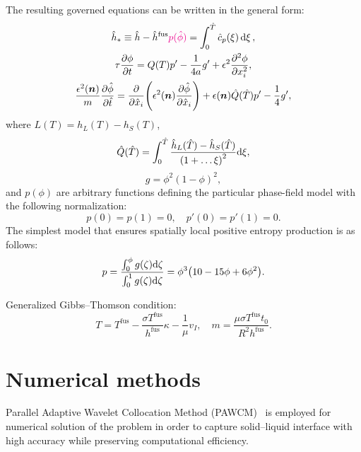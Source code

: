 \documentclass{article}
\newcommand{\fusion}[1]{{#1}^\mathrm{fus}}
\newcommand{\bn}{\boldsymbol{n}}
\newcommand{\Hx}{\hat{x}}
\newcommand{\Ht}{\hat{t}}
\newcommand{\Hh}{\hat{h}}
\newcommand{\HT}{\hat{T}}
\newcommand{\Hc}{\hat{c}}
\newcommand{\Hphi}{\hat{\phi}}
\newcommand\OVV[1]{{\color{magenta}#1}}
\begin{document}
The resulting governed equations can be written in the general form:
\begin{gather}
    \Hh_* \equiv \Hh - \fusion{\Hh}\OVV{p(\Hphi)} = \int_0^{\HT} \Hc_p(\xi)\dd{\xi}, \label{eq:enthalpy_new_hats} \\
    \tau\pdv{\phi}{t} = Q(T) p' - \frac1{4a} g' + \epsilon^2 \pdv[2]{\phi}{x_i}, \label{eq:phase_field} \\
    \frac{\epsilon^2(\bn)}{m}\pdv{\Hphi}{\Ht} = \pdv{\Hx_i}\qty({\epsilon^2(\bn)\pdv{\Hphi}{\Hx_i}})
        + \epsilon(\bn)\hat{Q}(\HT)p'  - \frac14g', \label{eq:phase_field_hats} \\
\end{gather}
where \(L(T) = h_L(T) - h_S(T)\),
\begin{equation}\label{eq:Q_function}
    \hat{Q}(\HT) = \int_0^{\HT} \frac{\Hh_L(\HT) - \Hh_S(\HT)}{\qty(1+\dots\xi)^2} \dd\xi,
\end{equation}
\begin{equation}\label{eq:g_function}
    g = \phi^2(1-\phi)^2,
\end{equation}
and \(p(\phi)\) are arbitrary functions defining the particular phase-field model
with the following normalization:
\begin{equation}\label{eq:p_function}
    p(0) = p(1) = 0, \quad p'(0) = p'(1) = 0.
\end{equation}
The simplest model that ensures spatially local positive entropy production is as follows:
\begin{equation}\label{eq:p_model}
    p = \frac{\int_0^\phi g(\zeta) \dd\zeta}{\int_0^1 g(\zeta) \dd\zeta} = \phi^3 \qty( 10 - 15\phi + 6\phi^2 ).
\end{equation}

Generalized Gibbs--Thomson condition:
\begin{equation}\label{eq:gibbs-thomson}
    T = \fusion{T} - \frac{\sigma \fusion{T}}{\fusion{h}}\kappa - \frac1\mu v_I, \quad
    m = \frac{\mu\sigma\fusion{T}t_0}{R^2\fusion{h}}.
\end{equation}


\section{Numerical methods}\label{sec:numerics}

Parallel Adaptive Wavelet Collocation Method (PAWCM)~\cite{Vasilyev2015} is employed for numerical solution of the problem
in order to capture solid--liquid interface with high accuracy while preserving computational efficiency.
\end{document}
